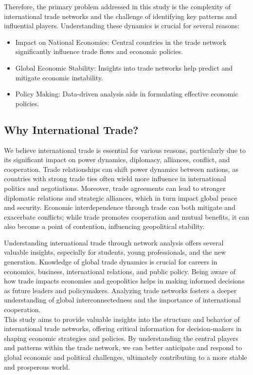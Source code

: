 \documentclass[12pt, a4paper]{article}
\begin{document}
Therefore, the primary problem addressed in this study is the complexity of international trade networks and the challenge of identifying key patterns and influential players. Understanding these dynamics is crucial for several reasons:
\begin{itemize}
    \item Impact on National Economies: Central countries in the trade network significantly influence trade flows and economic policies.
    \item Global Economic Stability: Insights into trade networks help predict and mitigate economic instability.
    \item Policy Making: Data-driven analysis aids in formulating effective economic policies.
\end{itemize}

\subsection{Why International Trade?}
We believe international trade is essential for various reasons, particularly due to its significant impact on power dynamics, diplomacy, alliances, conflict, and cooperation. Trade relationships can shift power dynamics between nations, as countries with strong trade ties often wield more influence in international politics and negotiations. Moreover, trade agreements can lead to stronger diplomatic relations and strategic alliances, which in turn impact global peace and security. Economic interdependence through trade can both mitigate and exacerbate conflicts; while trade promotes cooperation and mutual benefits, it can also become a point of contention, influencing geopolitical stability. 

Understanding international trade through network analysis offers several valuable insights, especially for students, young professionals, and the new generation. Knowledge of global trade dynamics is crucial for careers in economics, business, international relations, and public policy. Being aware of how trade impacts economies and geopolitics helps in making informed decisions as future leaders and policymakers. Analyzing trade networks fosters a deeper understanding of global interconnectedness and the importance of international cooperation. \\This study aims to provide valuable insights into the structure and behavior of international trade networks, offering critical information for decision-makers in shaping economic strategies and policies. By understanding the central players and patterns within the trade network, we can better anticipate and respond to global economic and political challenges, ultimately contributing to a more stable and prosperous world.
\end{document}
